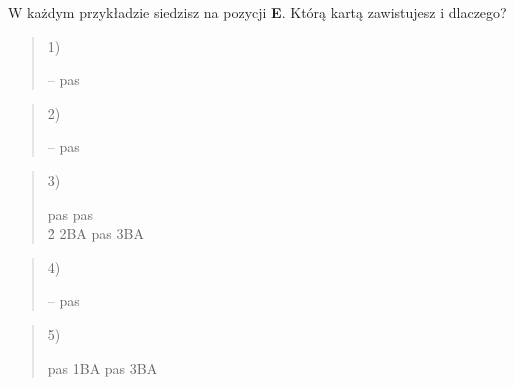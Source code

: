 \documentclass{article}
\begin{document}
W każdym przykładzie siedzisz na pozycji \textbf{E}. Którą kartą zawistujesz i dlaczego?\\

\begin{quote}
1)
\hspace{.5\br}
\begin{minipage}[t]{\br}
\begin{bidding}
-- \s\> pas \s \\
\end{bidding}
\end{minipage}
\end{quote}

\begin{quote}
2)
\hspace{.5\br}
\begin{minipage}[t]{\br}
\begin{bidding}
-- \s\> pas \s \\
\end{bidding}
\end{minipage}
\end{quote}

\begin{quote}
3)
\hspace{.5\br}
\begin{minipage}[t]{\br}
\begin{bidding}
pas \s\> pas \c \\
2\h \> 2BA\> pas \> 3BA \\
\end{bidding}
\end{minipage}
\end{quote}

\begin{quote}
4)
\hspace{.5\br}
\begin{minipage}[t]{\br}
\begin{bidding}
-- \s\> pas \s \\
\end{bidding}
\end{minipage}
\end{quote}

\begin{quote}
5)
\hspace{.5\br}
\begin{minipage}[t]{\br}
\begin{bidding}
pas \> 1BA\> pas \> 3BA \\
\end{bidding}
\end{minipage}
\end{quote}
\end{document}
